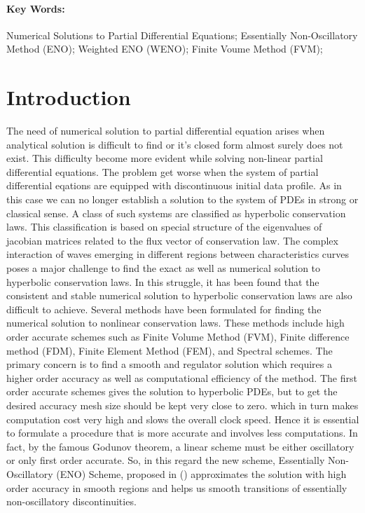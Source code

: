 \documentclass{article}
\begin{document}
\paragraph{\textbf{Key Words:}}
Numerical Solutions to Partial Differential Equations; Essentially Non-Oscillatory Method (ENO); Weighted ENO (WENO); Finite Voume Method (FVM);

\section{Introduction}
 The need of numerical solution to partial differential equation arises when analytical solution is difficult to find or it's closed form almost surely does not exist. This difficulty become more evident while solving non-linear partial differential equations. The problem get worse when the system of partial differential eqations are equipped with discontinuous initial data profile. As in this case we can no longer establish a solution to the system of PDEs in strong or classical sense. A class of such systems are classified as hyperbolic conservation laws. This classification is based on special structure of the eigenvalues of jacobian matrices related to the flux vector of conservation law. The complex interaction of waves emerging in different regions between characteristics curves poses a major challenge to find the exact as well as numerical solution to hyperbolic conservation laws. In this struggle, it has been found that the consistent and stable numerical solution to hyperbolic conservation laws are also difficult to achieve. Several methods have been formulated for finding the numerical solution to nonlinear conservation laws. These methods include high order accurate schemes such as Finite Volume Method (FVM), Finite difference method (FDM), Finite Element Method (FEM), and Spectral schemes. The primary concern is to find a smooth and regulator solution which requires a higher order accuracy as well as computational efficiency of the method. The first order accurate schemes gives the solution to hyperbolic PDEs, but to get the desired accuracy mesh size should be kept very close to zero. which in turn makes computation cost very high and slows the overall clock speed. Hence it is essential to formulate a procedure that is more accurate and involves less computations.  
In fact, by the famous Godunov theorem, a linear scheme must be either oscillatory or only first order accurate. So, in this regard the new scheme, Essentially Non-Oscillatory (ENO) Scheme, proposed in (\cite{harten1987uniformly})  approximates the solution with high order accuracy in smooth regions and helps us smooth transitions of essentially non-oscillatory discontinuities.
\end{document}
